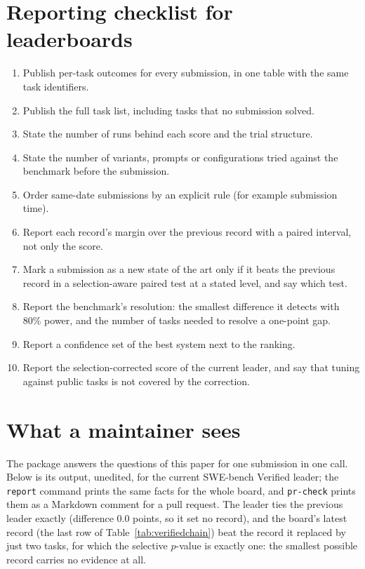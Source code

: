 \documentclass[11pt]{article}
\begin{document}
\section{Reporting checklist for leaderboards}\label{app:checklist}
\begin{enumerate}
\item Publish per-task outcomes for every submission, in one table with the same task identifiers.
\item Publish the full task list, including tasks that no submission solved.
\item State the number of runs behind each score and the trial structure.
\item State the number of variants, prompts or configurations tried against the benchmark before the submission.
\item Order same-date submissions by an explicit rule (for example submission time).
\item Report each record's margin over the previous record with a paired interval, not only the score.
\item Mark a submission as a new state of the art only if it beats the previous record in a selection-aware paired test at a stated level, and say which test.
\item Report the benchmark's resolution: the smallest difference it detects with 80\% power, and the number of tasks needed to resolve a one-point gap.
\item Report a confidence set of the best system next to the ranking.
\item Report the selection-corrected score of the current leader, and say that tuning against public tasks is not covered by the correction.
\end{enumerate}

\section{What a maintainer sees}\label{app:prcheck}
The package answers the questions of this paper for one submission in one call.
Below is its output, unedited, for the current SWE-bench Verified leader; the \texttt{report} command prints the same facts for the whole board, and \texttt{pr-check} prints them as a Markdown comment for a pull request.
The leader ties the previous leader exactly (difference 0.0 points, so it set no record), and the board's latest record (the last row of Table~\ref{tab:verifiedchain}) beat the record it replaced by just two tasks, for which the selective $p$-value is exactly one: the smallest possible record carries no evidence at all.
{\footnotesize}
\end{document}
